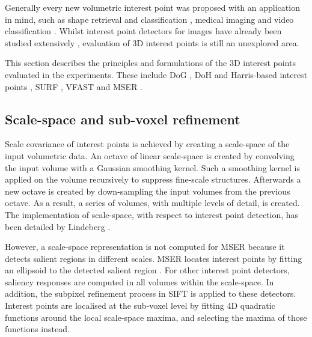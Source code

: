 Generally every new volumetric interest point was proposed with an application in mind, such as shape retrieval and classification \cite{Riemenschneider2009,Flitton2010,Knopp2010,Prasad2011}, medical imaging \cite{Criminisi2011,Ni2008,Donner2011} and video classification \cite{Willems2009,Laptev2005,Yu2010}. 
Whilst interest point detectors for images have already been studied extensively \cite{Mikolajczyk2005, Tuytelaars2008}, evaluation of 3D interest points is still an unexplored area. 

This section describes the principles and formulations of the 3D interest points evaluated in the experiments. These include DoG \cite{Flitton2010, Pham2011}, DoH and Harris-based interest points \cite{Laptev2005}, SURF \cite{Willems2008, Knopp2010}, VFAST \cite{Yu2010} and MSER \cite{Donoser2006, Riemenschneider2009}. 

\subsection{Scale-space and sub-voxel refinement}
\label{sec/eval/subvoxel}

Scale covariance of interest points is achieved by creating a scale-space of the input volumetric data. An octave of linear scale-space is created by convolving the input volume with a Gaussian smoothing kernel. Such a smoothing kernel is applied on the volume recursively to suppress fine-scale structures. Afterwards a new octave is created by down-sampling the input volumes from the previous octave. As a result, a series of volumes, with multiple levels of detail, is created. The implementation of scale-space, with respect to interest point detection, has been detailed by Lindeberg \cite{Lindeberg1998}. 

However, a scale-space representation is not computed for MSER because it detects salient regions in different scales. MSER locates interest points by fitting an ellipsoid to the detected salient region \cite{Matas2004}. For other interest point detectors, saliency responses are computed in all volumes within the scale-space. In addition, the subpixel refinement process in SIFT \cite{Lowe2004} is applied to these detectors. Interest points are localised at the sub-voxel level by fitting 4D quadratic functions around the local scale-space maxima, and selecting the maxima of those functions instead. 


